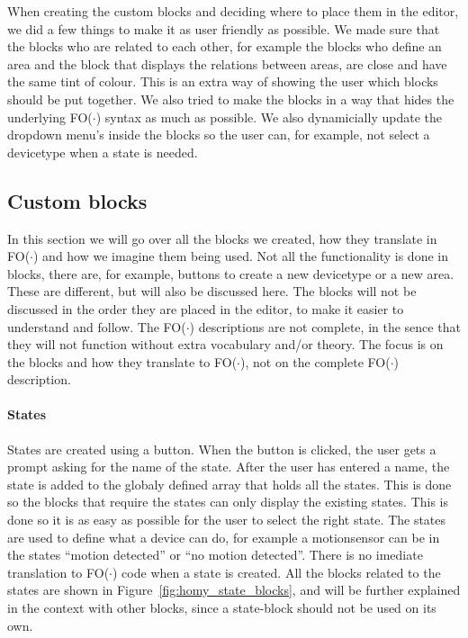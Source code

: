 \documentclass[11pt,a4paper]{report}
\newcommand{\fodot}{FO($\cdot$)\xspace}
\begin{document}
When creating the custom blocks and deciding where to place them in the editor, we did a few things to make it as user friendly as possible. We made sure that the blocks who are related to each other, for example the blocks who define an area and the block that displays the relations between areas, are close and have the same tint of colour. This is an extra way of showing the user which blocks should be put together. We also tried to make the blocks in a way that hides the underlying \fodot syntax as much as possible. We also dynamicially update the dropdown menu's inside the blocks so the user can, for example, not select a devicetype when a state is needed.

\subsection{Custom blocks}
In this section we will go over all the blocks we created, how they translate in \fodot and how we imagine them being used. Not all the functionality is done in blocks, there are, for example, buttons to create a new devicetype or a new area. These are different, but will also be discussed here. The blocks will not be discussed in the order they are placed in the editor, to make it easier to understand and follow. The \fodot descriptions are not complete, in the sence that they will not function without extra vocabulary and/or theory. The focus is on the blocks and how they translate to \fodot, not on the complete \fodot description.

\paragraph{States}
States are created using a button. When the button is clicked, the user gets a prompt asking for the name of the state. After the user has entered a name, the state is added to the globaly defined array that holds all the states. This is done so the blocks that require the states can only display the existing states. This is done so it is as easy as possible for the user to select the right state. The states are used to define what a device can do, for example a motionsensor can be in the states ``motion detected'' or ``no motion detected''. There is no imediate translation to \fodot code when a state is created. All the blocks related to the states are shown in Figure~\ref{fig:homy_state_blocks}, and will be further explained in the context with other blocks, since a state-block should not be used on its own.
\end{document}
